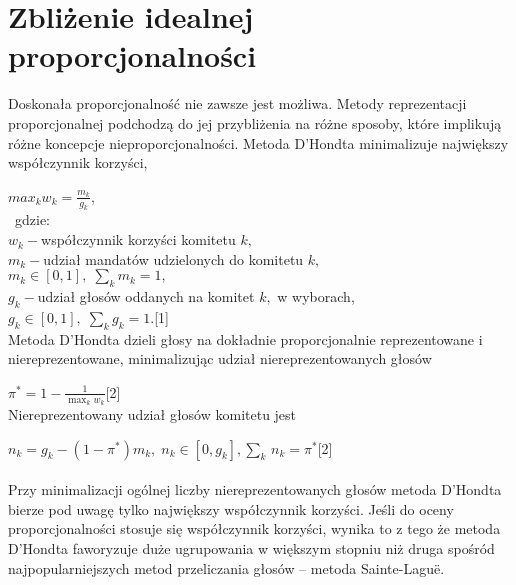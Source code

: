 \documentclass[12pt,a4paper,titlepage]{report}
\begin{document}
\section{Zbliżenie idealnej proporcjonalności}
Doskonała proporcjonalność nie zawsze jest możliwa. Metody reprezentacji proporcjonalnej podchodzą do jej przybliżenia na różne sposoby, które implikują różne koncepcje nieproporcjonalności. Metoda D’Hondta minimalizuje największy współczynnik korzyści, 

\begin{math}max_{k}w_{k}={\frac {m_{k}}{g_{k}}}\end{math}, \\ \
gdzie: \\
\begin{math}w_{k}-\end{math}współczynnik korzyści komitetu
\begin{math}k,\end{math} \\
\begin{math}m_{k}-\end{math}udział mandatów udzielonych do komitetu
\begin{math}k,\end{math} \\
\begin{math} m_{k}\in [0,1],\;\sum\limits _{k}m_{k}=1,\end{math} \\
\begin{math}g_{k}-\end{math}udział głosów oddanych na komitet
\begin{math}k,\end{math} w wyborach,\\
\begin{math} g_{k}\in [0,1],\;\sum\limits_{k} g_{k}=1.\end{math}[1] \\
Metoda D’Hondta dzieli głosy na dokładnie proporcjonalnie reprezentowane i niereprezentowane, minimalizując udział niereprezentowanych głosów 

\begin{math}\pi ^{*}=1-{\frac {1}{\max _{k}w_{k}}}\end{math}[2] \\
Niereprezentowany udział głosów komitetu jest 

\begin{math} n_{k}=g_{k}-(1-\pi ^{*})m_{k},\;n_{k}\in [0,g_{k}],\sum _{k}\,n_{k}=\pi ^{*}\end{math}[2] \\ \\
Przy minimalizacji ogólnej liczby niereprezentowanych głosów metoda D’Hondta bierze pod uwagę tylko największy współczynnik korzyści. Jeśli do oceny proporcjonalności stosuje się współczynnik korzyści, wynika to z tego że metoda D’Hondta faworyzuje duże ugrupowania w większym stopniu niż druga spośród najpopularniejszych metod przeliczania głosów – metoda Sainte-Laguë.
\end{document}
